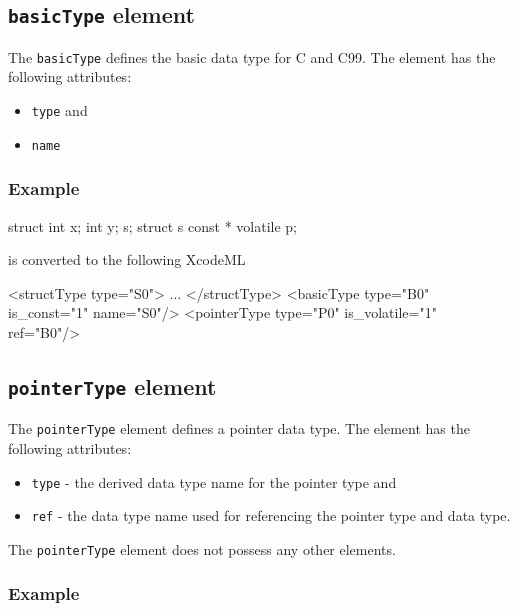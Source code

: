 \subsection{ {\tt basicType} element}

The {\tt basicType} defines the basic data type for C and C99. The element has the following attributes:

\begin{itemize}
\item {\tt type} and
\item {\tt name}
\end{itemize}

\subsubsection*{Example}
\vspace{1mm}

\begin{CExample}
struct {int x; int y;} s;
struct s const * volatile p;
\end{CExample}

is converted to the following XcodeML
\vspace{2mm}

\begin{XcodeMLExample}
  <structType type="S0">
    ...
  </structType>
  <basicType type="B0" is_const="1" name="S0"/>
  <pointerType type="P0" is_volatile="1" ref="B0"/>
\end{XcodeMLExample}


\subsection{ {\tt pointerType} element}

The {\tt pointerType} element defines a pointer data type. The element has the following attributes:

\begin{itemize}
\item {\tt type} - the derived data type name for the pointer type and
\item {\tt ref} - the data type name used for referencing the pointer type and data type.
\end{itemize}

The {\tt pointerType} element does not possess any other elements.

\subsubsection*{Example}

